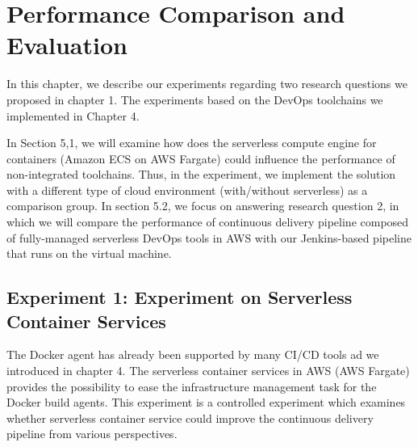 \chapter{Performance Comparison and Evaluation}
In this chapter, we describe our experiments regarding two research questions we proposed in chapter 1. The experiments based on the DevOps toolchains we implemented in Chapter 4.
\par
In Section 5,1, we will examine how does the serverless compute engine for containers (Amazon ECS on AWS Fargate) could influence the performance of non-integrated toolchains. Thus, in the experiment, we implement the solution with a different type of cloud environment (with/without serverless) as a comparison group.
In section 5.2, we focus on answering research question 2, in which we will compare the performance of continuous delivery pipeline composed of fully-managed serverless DevOps tools in AWS with our Jenkins-based pipeline that runs on the virtual machine.
\section{Experiment 1: Experiment on Serverless Container Services}
The Docker agent has already been supported by many CI/CD tools ad we introduced in chapter 4.
The serverless container services in AWS (AWS Fargate) provides the possibility to ease the infrastructure management task for the Docker build agents.
This experiment is a controlled experiment which examines whether serverless container service could improve the continuous delivery pipeline from various perspectives.
